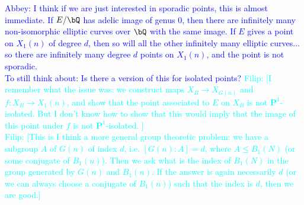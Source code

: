 \documentclass[11pt,reqno]{amsart}
\theoremstyle{plain}
\theoremstyle{definition}
\newcommand{\Q}{\bQ}
\newcommand{\PP}{\mathbf P}
\newcommand{\filip}[1]{{\textcolor{cyan}{Filip: [#1]}}}
\newcommand{\abbey}[1]{\textcolor{blue}{Abbey: #1}}
\begin{document}
\abbey{I think if we are just interested in sporadic points, this is almost immediate. If $E/\Q$ has adelic image of genus 0, then there are infinitely many non-isomorphic elliptic curves over $\Q$ with the same image. If $E$ gives a point on $X_1(n)$ of degree $d$, then so will all the other infinitely many elliptic curves... so there are infinitely many degree $d$ points on $X_1(n)$, and the point is not sporadic.\\
To still think about: Is there a version of this for isolated points? }
\filip{I remember what the issue was: we construct maps $X_B\rightarrow X_{G(n)}$ and $f:X_B\rightarrow X_1(n)$, and show that the point associated to $E$ on $X_B$ is not $\PP^1$-isolated. But I don't know how to show that this would imply that the image of this point under $f$ is not $\PP^1$-isolated. }\\
\filip{This is I think a more general group theoretic problem: we have a subgroup $A$ of $G(n)$ of index $d$, i.e. $[G(n):A]=d$, where $A\leq B_1(N)$ (or some conjugate of $B_1(n)$). Then we ask what is the index of $B_1(N)$ in the group generated by $G(n)$ and $B_1(n)$. If the answer is again necessarily $d$ (or we can always choose a conjugate of $B_1(n)$) such that the index is $d$, then we are good.}

\vspace{20 mm}


\end{document}
